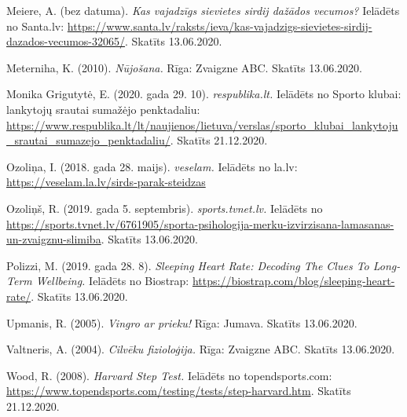 \documentclass[12pt]{article}
\begin{document}
\begin{thebibliography}{9}
Meiere, A. (bez datuma). \textit{Kas vajadzīgs sievietes sirdij dažādos vecumos?} Ielādēts no Santa.lv: \url{https://www.santa.lv/raksts/ieva/kas-vajadzigs-sievietes-sirdij-dazados-vecumos-32065/}. Skatīts 13.06.2020.

Meterniha, K. (2010). \textit{Nūjošana.} Rīga: Zvaigzne ABC. Skatīts 13.06.2020.

Monika Grigutytė, E. (2020. gada 29. 10). \textit{respublika.lt.} Ielādēts no Sporto klubai: lankytojų srautai sumažėjo penktadaliu: \url{https://www.respublika.lt/lt/naujienos/lietuva/verslas/sporto_klubai_lankytoju_srautai_sumazejo_penktadaliu/}. Skatīts 21.12.2020.

Ozoliņa, I. (2018. gada 28. maijs). \textit{veselam.} Ielādēts no la.lv: \url{https://veselam.la.lv/sirds-parak-steidzas}

Ozoliņš, R. (2019. gada 5. septembris). \textit{sports.tvnet.lv.} Ielādēts no \url{https://sports.tvnet.lv/6761905/sporta-psihologija-merku-izvirzisana-lamasanas-un-zvaigznu-slimiba}. Skatīts 13.06.2020.

Polizzi, M. (2019. gada 28. 8). \textit{Sleeping Heart Rate: Decoding The Clues To Long-Term Wellbeing.} Ielādēts no Biostrap: \url{https://biostrap.com/blog/sleeping-heart-rate/}. Skatīts 13.06.2020.

Upmanis, R. (2005). \textit{Vingro ar prieku!} Rīga: Jumava. Skatīts 13.06.2020.

Valtneris, A. (2004). \textit{Cilvēku fizioloģija.} Rīga: Zvaigzne ABC. Skatīts 13.06.2020.

Wood, R. (2008). \textit{Harvard Step Test.} Ielādēts no topendsports.com: \url{https://www.topendsports.com/testing/tests/step-harvard.htm}. Skatīts 21.12.2020.
\end{thebibliography} 
\end{document}
